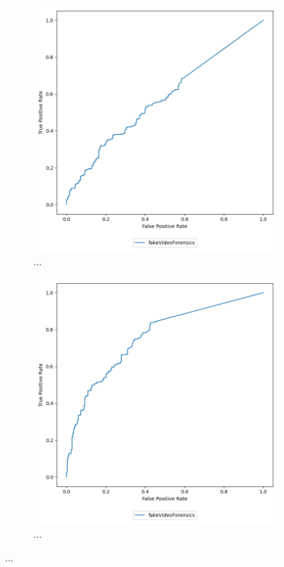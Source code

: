 \begin{figure}[H]
    \begin{subfigure}[h]{0.5\linewidth}
        \centering
        \includegraphics[width=1\linewidth]{other-fig/tests/cdf_methods.png}
        \caption{...}
    \end{subfigure}
    \hfill
    \begin{subfigure}[h]{0.5\linewidth}
        \centering
        \includegraphics[width=1\linewidth]{other-fig/tests/ff_methods.png}
        \caption{...}
    \end{subfigure}
    \caption{...}
\end{figure}

